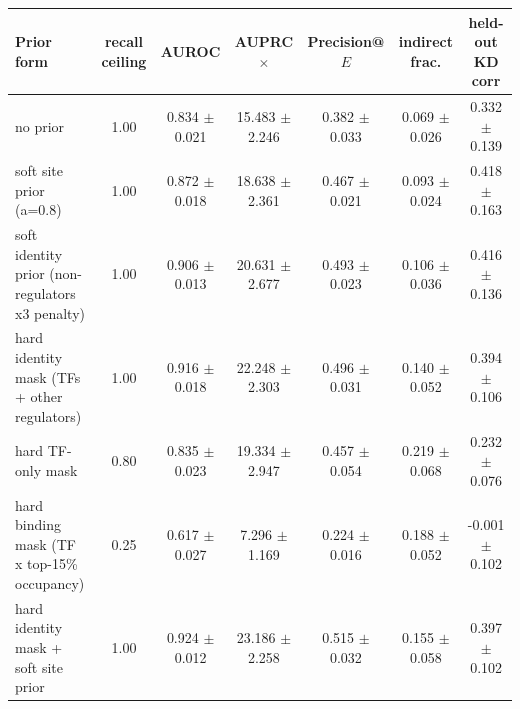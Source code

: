 \begin{tabular}{p{4.6cm}cccccc}
\toprule
Prior form & recall ceiling & AUROC & AUPRC$\times$ & Precision@$E$ & indirect frac. & held-out KD corr \\
\midrule
no prior & 1.00 & 0.834 $\pm$ 0.021 & 15.483 $\pm$ 2.246 & 0.382 $\pm$ 0.033 & 0.069 $\pm$ 0.026 & 0.332 $\pm$ 0.139 \\
soft site prior (a=0.8) & 1.00 & 0.872 $\pm$ 0.018 & 18.638 $\pm$ 2.361 & 0.467 $\pm$ 0.021 & 0.093 $\pm$ 0.024 & 0.418 $\pm$ 0.163 \\
soft identity prior (non-regulators x3 penalty) & 1.00 & 0.906 $\pm$ 0.013 & 20.631 $\pm$ 2.677 & 0.493 $\pm$ 0.023 & 0.106 $\pm$ 0.036 & 0.416 $\pm$ 0.136 \\
hard identity mask (TFs + other regulators) & 1.00 & 0.916 $\pm$ 0.018 & 22.248 $\pm$ 2.303 & 0.496 $\pm$ 0.031 & 0.140 $\pm$ 0.052 & 0.394 $\pm$ 0.106 \\
hard TF-only mask & 0.80 & 0.835 $\pm$ 0.023 & 19.334 $\pm$ 2.947 & 0.457 $\pm$ 0.054 & 0.219 $\pm$ 0.068 & 0.232 $\pm$ 0.076 \\
hard binding mask (TF x top-15\% occupancy) & 0.25 & 0.617 $\pm$ 0.027 & 7.296 $\pm$ 1.169 & 0.224 $\pm$ 0.016 & 0.188 $\pm$ 0.052 & -0.001 $\pm$ 0.102 \\
hard identity mask + soft site prior & 1.00 & 0.924 $\pm$ 0.012 & 23.186 $\pm$ 2.258 & 0.515 $\pm$ 0.032 & 0.155 $\pm$ 0.058 & 0.397 $\pm$ 0.102 \\
\bottomrule
\end{tabular}